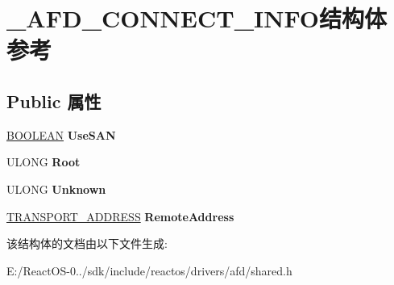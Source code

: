 \hypertarget{struct___a_f_d___c_o_n_n_e_c_t___i_n_f_o}{}\section{\+\_\+\+A\+F\+D\+\_\+\+C\+O\+N\+N\+E\+C\+T\+\_\+\+I\+N\+F\+O结构体 参考}
\label{struct___a_f_d___c_o_n_n_e_c_t___i_n_f_o}
\subsection*{Public 属性}
\begin{DoxyCompactItemize}
\item 
\mbox{\label{struct___a_f_d___c_o_n_n_e_c_t___i_n_f_o_ab2edf98d88b9718be09b93991dd4c594}} 
\hyperlink{_processor_bind_8h_a112e3146cb38b6ee95e64d85842e380a}{B\+O\+O\+L\+E\+AN} {\bfseries Use\+S\+AN}
\item 
\mbox{\label{struct___a_f_d___c_o_n_n_e_c_t___i_n_f_o_ac6abf1251a896f6b88b7a46fff6d39a1}} 
U\+L\+O\+NG {\bfseries Root}
\item 
\mbox{\label{struct___a_f_d___c_o_n_n_e_c_t___i_n_f_o_a602e243b21b3dc9c3927793d86f470c4}} 
U\+L\+O\+NG {\bfseries Unknown}
\item 
\mbox{\label{struct___a_f_d___c_o_n_n_e_c_t___i_n_f_o_a6961a75109c26527c3f9e795c84cd995}} 
\hyperlink{struct___t_r_a_n_s_p_o_r_t___a_d_d_r_e_s_s}{T\+R\+A\+N\+S\+P\+O\+R\+T\+\_\+\+A\+D\+D\+R\+E\+SS} {\bfseries Remote\+Address}
\end{DoxyCompactItemize}


该结构体的文档由以下文件生成\+:\begin{DoxyCompactItemize}
\item 
E\+:/\+React\+O\+S-\/0../sdk/include/reactos/drivers/afd/shared.\+h\end{DoxyCompactItemize}
